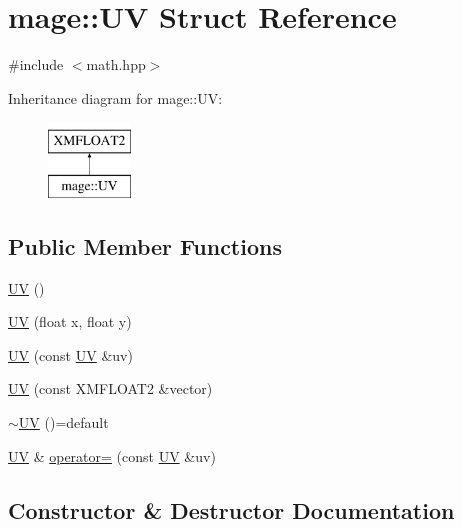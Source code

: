 \hypertarget{structmage_1_1_u_v}{}\section{mage\+:\+:UV Struct Reference}
\label{structmage_1_1_u_v}


{\ttfamily \#include $<$math.\+hpp$>$}

Inheritance diagram for mage\+:\+:UV\+:\begin{figure}[H]
\begin{center}
\leavevmode
\includegraphics[height=2.000000cm]{structmage_1_1_u_v}
\end{center}
\end{figure}
\subsection*{Public Member Functions}
\begin{DoxyCompactItemize}
\item 
\hyperlink{structmage_1_1_u_v_a777c466d20ed20386326299d373b4cb8}{UV} ()
\item 
\hyperlink{structmage_1_1_u_v_adc915f36ebb2dede57f2ddfd130e9321}{UV} (float x, float y)
\item 
\hyperlink{structmage_1_1_u_v_a3e31395f3be9fc757040bc242b72fe1f}{UV} (const \hyperlink{structmage_1_1_u_v}{UV} \&uv)
\item 
\hyperlink{structmage_1_1_u_v_a9aa55008cd8f18f25817209198cf0ec2}{UV} (const X\+M\+F\+L\+O\+A\+T2 \&vector)
\item 
\hyperlink{structmage_1_1_u_v_a9389be8cc9bb64861b69f79b44b6dd1b}{$\sim$\+UV} ()=default
\item 
\hyperlink{structmage_1_1_u_v}{UV} \& \hyperlink{structmage_1_1_u_v_abb607259f1710f1344f83ebc21a1a5da}{operator=} (const \hyperlink{structmage_1_1_u_v}{UV} \&uv)
\end{DoxyCompactItemize}


\subsection{Constructor \& Destructor Documentation}
\hypertarget{structmage_1_1_u_v_a777c466d20ed20386326299d373b4cb8}{}\label{structmage_1_1_u_v_a777c466d20ed20386326299d373b4cb8} 
